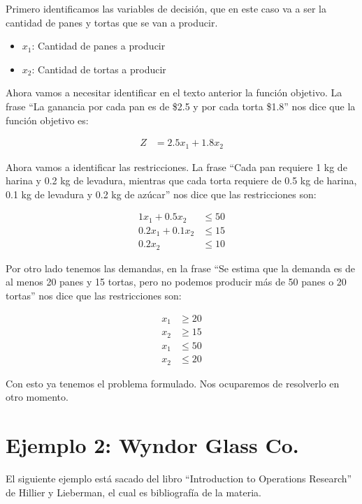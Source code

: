 \documentclass[12pt]{article}
\begin{document}
Primero identificamos las variables de decisión, que en este caso va a ser la cantidad de panes y tortas que se van a producir.

\begin{itemize}
    \item $x_1$: Cantidad de panes a producir
    \item $x_2$: Cantidad de tortas a producir
\end{itemize}

Ahora vamos a necesitar identificar en el texto anterior la función objetivo. La frase ``La ganancia por cada pan es de \$2.5 y por cada torta \$1.8'' nos dice que la función objetivo es:

\begin{align*}
Z &= 2.5x_1 + 1.8x_2
\end{align*}

Ahora vamos a identificar las restricciones. La frase ``Cada pan requiere 1 kg de harina y 0.2 kg de levadura, mientras que cada torta requiere de 0.5 kg de harina, 0.1 kg de levadura y 0.2 kg de azúcar'' nos dice que las restricciones son:

\begin{align*}
1x_1 + 0.5x_2 &\leq 50 \\
0.2x_1 + 0.1x_2&\leq 15 \\
0.2x_2 &\leq 10
\end{align*}

Por otro lado tenemos las demandas, en la frase ``Se estima que la demanda es de al menos 20 panes y 15 tortas, pero no podemos producir más de 50 panes o 20 tortas'' nos dice que las restricciones son:

\begin{align*}
x_1 &\geq 20 \\
x_2 &\geq 15 \\
x_1 &\leq 50 \\
x_2 &\leq 20
\end{align*}

Con esto ya tenemos el problema formulado. Nos ocuparemos de resolverlo en otro momento.

\section{Ejemplo 2: Wyndor Glass Co.}

El siguiente ejemplo está sacado del libro ``Introduction to Operations Research'' de Hillier y Lieberman, el cual es bibliografía de la materia.
\end{document}
